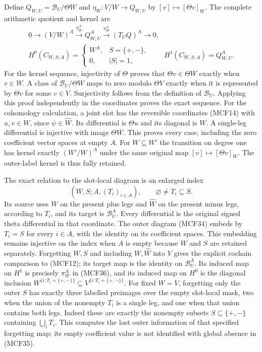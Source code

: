\documentclass[11pt,a4paper]{article}
\begin{document}
Define $Q_{W,U}=\mathscr B_U/\Theta W$ and
$\eta_W:V/W\to Q_{W,U}$ by $[v]\mapsto[\Theta v]_W$.
The complete arithmetic quotient and kernel are
\[
\begin{gathered}
0\longrightarrow(V/W)^A\xrightarrow{\eta_W^A}Q_{W,U}^A
       \xrightarrow{\pi_W^A}(T_UQ)^A\longrightarrow0,\\
H^0(C_{W,S;A})=
 \begin{cases}W^A,&S=\{+,-\},\\0,&|S|=1,\end{cases}
\qquad H^1(C_{W,S;A})=Q_{W,U}^A.
\end{gathered}
\tag{MCF36}
\]
For the kernel sequence, injectivity of $\Theta$ proves that
$\Theta v\in\Theta W$ exactly when $v\in W$.  A class of
$\mathscr B_U/\Theta W$ maps to zero modulo $\Theta V$ exactly when
it is represented by $\Theta v$ for some $v\in V$.  Surjectivity
follows from the definition of $\mathscr B_U$.  Applying this proof
independently in the coordinates proves the exact sequence.
For the cohomology calculation, a joint slot has the reversible
coordinates (MCF14) with $u,v\in W$, since $\psi\in\widehat W$.
Its differential is $\Theta u$ and its diagonal is $W$.
A single-leg differential is injective with image $\Theta W$.
This proves every case, including the zero coefficient vector spaces
at empty $A$.  For $W\subseteq W'$ the transition on degree one has
kernel exactly $(W'/W)^A$ under the same original map $[v]\mapsto
[\Theta v]_W$.  The outer-label kernel is thus fully retained.

The exact relation to the slot-local diagram is an enlarged index
\[
(W,S;A,(T_i)_{i\in A}),\qquad
\varnothing\ne T_i\subseteq S.
\tag{MCF37}
\]
Its source uses $W$ on the present plus legs and $\widehat W$ on the
present minus legs, according to $T_i$, and its target is
$\mathscr B_U^A$.  Every differential is the original signed theta
differential in that coordinate.  The outer diagram (MCF34) embeds
by $T_i=S$ for every $i\in A$, with the identity on its coefficient
spaces.  This embedding remains injective on the index when $A$ is
empty because $W$ and $S$ are retained separately.
Forgetting $W,S$ and including $W,\widehat W$ into $V$ gives the
explicit cochain comparison to (MCF12); its target map is the identity
on $\mathscr B_U^A$.  Its induced map on $H^1$ is precisely $\pi_W^A$ in
(MCF36), and its induced map on $H^0$ is the diagonal inclusion
$W^{\{i:T_i=\{+,-\}\}}\subseteq V^{\{i:T_i=\{+,-\}\}}$.
For fixed $W=V$, forgetting only the outer $S$ has exactly three
labelled preimages over the empty slot-local mask, two when the union
of the nonempty $T_i$ is a single leg, and one when that union contains
both legs.  Indeed these are exactly the nonempty subsets
$S\subseteq\{+,-\}$ containing $\bigcup_iT_i$.
This computes the lost outer information of that specified forgetting
map; its empty coefficient value is not identified with global
absence in (MCF35).
\end{document}
